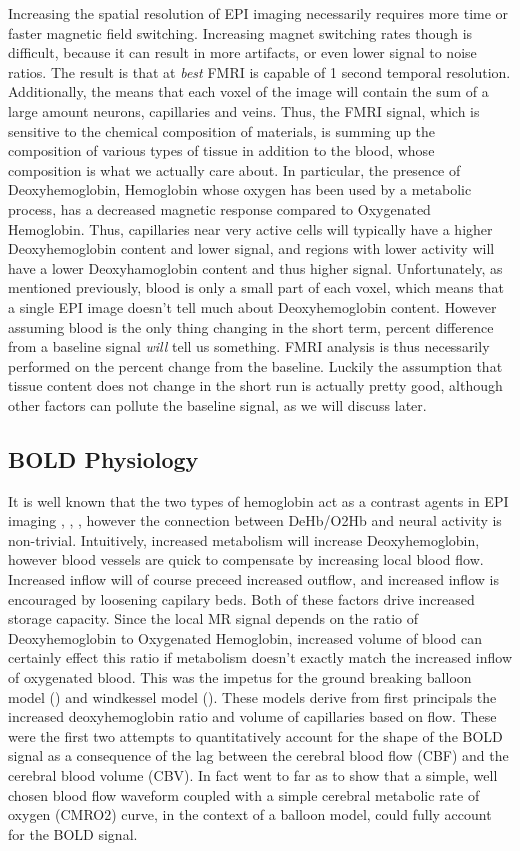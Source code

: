 \documentclass{article}
\begin{document}
Increasing the spatial resolution of EPI imaging necessarily 
requires more time or faster magnetic field switching. Increasing
magnet switching rates though is difficult, because it can result in
more artifacts, or even lower signal to noise ratios. The result is
that at \emph{best} FMRI is capable of 1 second temporal resolution. 
Additionally, the means that each voxel of the image will contain 
the sum of a large amount neurons, capillaries and veins. Thus, the
FMRI signal, which is sensitive to the chemical composition of 
materials, is summing up the composition of various types of tissue
in addition to the blood, whose composition is what we actually care about.
In particular, the presence of Deoxyhemoglobin, Hemoglobin whose
oxygen has been used by a metabolic process, has a decreased magnetic
response compared to Oxygenated Hemoglobin. Thus, capillaries near
very active cells will typically have a higher Deoxyhemoglobin content and
lower signal, and regions with lower activity will have a lower 
Deoxyhamoglobin content and thus higher signal.
Unfortunately, as mentioned previously, blood is only a small part of
each voxel, which means that a single EPI image doesn't tell much about
Deoxyhemoglobin content. However assuming blood is the only thing changing
in the short term, percent difference from a baseline signal \emph{will}
tell us something. FMRI analysis is thus necessarily performed on the percent change
from the baseline. Luckily the assumption that tissue content does not change in
the short run is actually pretty good, although other factors can pollute
the baseline signal, as we will discuss later. 

\subsection{BOLD Physiology}
It is well known that the two types of hemoglobin act as a contrast agents in 
EPI imaging
\cite{Buxton1999}, \cite{WEISSKOFF1994}, \cite{Ogawa}, however the connection
between DeHb/O2Hb and neural activity is non-trivial. Intuitively, increased 
metabolism will increase Deoxyhemoglobin, however blood vessels are quick
to compensate by increasing local blood flow. Increased inflow will of course
preceed increased outflow, and increased inflow is encouraged by loosening 
capilary beds. Both of these factors drive increased storage capacity.
Since the local MR signal depends on the ratio of Deoxyhemoglobin to Oxygenated
Hemoglobin, increased volume of blood can certainly effect this ratio if 
metabolism doesn't exactly match the increased inflow of oxygenated blood.
This was the impetus
for the ground breaking balloon model (\cite{Buxton1999}) and windkessel
model (\cite{Mandeville1999}). These models derive from first principals
the increased deoxyhemoglobin ratio and volume of capillaries based on flow.
These were the first two attempts to quantitatively account for the shape of the 
BOLD signal as a consequence of the lag between the cerebral blood flow (CBF) 
and the cerebral blood volume (CBV). In fact \cite{Buxton1999} went to far as
to show that a simple, well chosen blood flow waveform coupled with a simple
cerebral metabolic rate of oxygen (CMRO2) curve, in the context of a balloon 
model, could fully account for the BOLD signal. 
\end{document}

